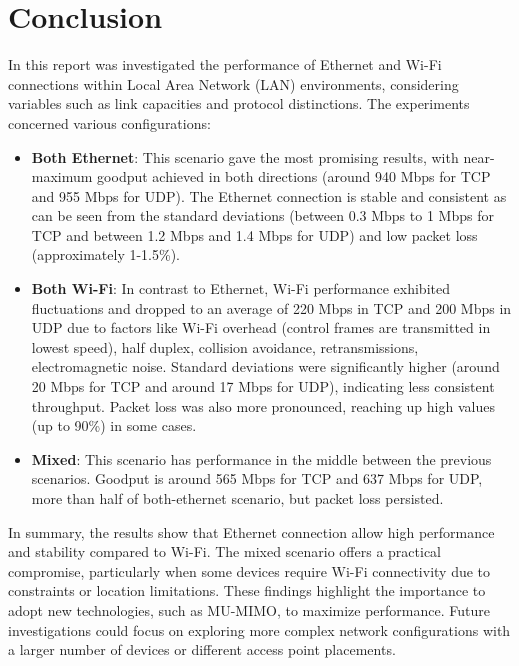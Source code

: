 \section{Conclusion}
\label{sec:conclusion}

In this report was investigated the performance of Ethernet and Wi-Fi connections within Local Area Network (LAN) environments, considering variables such as link capacities and protocol distinctions. The experiments concerned various configurations:

\begin{itemize}
    \item \textbf{Both Ethernet}: This scenario gave the most promising results, with near-maximum goodput achieved in both directions (around 940 Mbps for TCP and 955 Mbps for UDP). The Ethernet connection is stable and consistent as can be seen from the standard deviations (between 0.3 Mbps to 1 Mbps for TCP and between 1.2 Mbps and 1.4 Mbps for UDP) and low packet loss (approximately 1-1.5\%).

    \item \textbf{Both Wi-Fi}: In contrast to Ethernet, Wi-Fi performance exhibited fluctuations and dropped to an average of 220 Mbps in TCP and 200 Mbps in UDP due to factors like Wi-Fi overhead (control frames are transmitted in lowest speed), half duplex, collision avoidance, retransmissions, electromagnetic noise. Standard deviations were significantly higher (around 20 Mbps for TCP and around 17 Mbps for UDP), indicating less consistent throughput. Packet loss was also more pronounced, reaching up high values (up to 90\%) in some cases.

    \item \textbf{Mixed}: This scenario has performance in the middle between the previous scenarios. Goodput is around 565 Mbps for TCP and 637 Mbps for UDP, more than half of both-ethernet scenario, but packet loss persisted.

\end{itemize}
In summary, the results show that Ethernet connection allow high performance and stability compared to Wi-Fi. The mixed scenario offers a practical compromise, particularly when some devices require Wi-Fi connectivity due to constraints or location limitations. These findings highlight the importance to adopt new technologies, such as MU-MIMO, to maximize performance.
Future investigations could focus on exploring more complex network configurations with a larger number of devices or different access point placements.